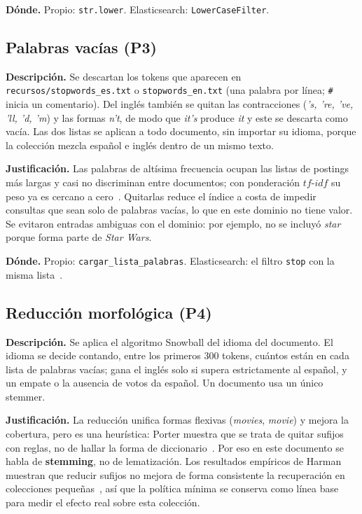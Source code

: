 \documentclass[11pt,spanish]{article}
\begin{document}
\textbf{Dónde.} Propio: \texttt{str.lower}. Elasticsearch: \texttt{LowerCaseFilter}.

\subsection{Palabras vacías (P3)}
\textbf{Descripción.} Se descartan los tokens que aparecen en \texttt{recursos/stopwords\_es.txt} o \texttt{stopwords\_en.txt} (una palabra por línea; \texttt{\#} inicia un comentario). Del inglés también se quitan las contracciones (\textit{'s, 're, 've, 'll, 'd, 'm}) y las formas \textit{n't}, de modo que \textit{it's} produce \textit{it} y este se descarta como vacía. Las dos listas se aplican a todo documento, sin importar su idioma, porque la colección mezcla español e inglés dentro de un mismo texto.

\textbf{Justificación.} Las palabras de altísima frecuencia ocupan las listas de postings más largas y casi no discriminan entre documentos; con ponderación $tf\text{-}idf$ su peso ya es cercano a cero~\cite{salton1988}. Quitarlas reduce el índice a costa de impedir consultas que sean solo de palabras vacías, lo que en este dominio no tiene valor. Se evitaron entradas ambiguas con el dominio: por ejemplo, no se incluyó \textit{star} porque forma parte de \textit{Star Wars}.

\textbf{Dónde.} Propio: \texttt{cargar\_lista\_palabras}. Elasticsearch: el filtro \texttt{stop} con la misma lista~\cite{es-stopfilter}.

\subsection{Reducción morfológica (P4)}
\textbf{Descripción.} Se aplica el algoritmo Snowball del idioma del documento. El idioma se decide contando, entre los primeros 300 tokens, cuántos están en cada lista de palabras vacías; gana el inglés solo si supera estrictamente al español, y un empate o la ausencia de votos da español. Un documento usa un único stemmer.

\textbf{Justificación.} La reducción unifica formas flexivas (\textit{movies}, \textit{movie}) y mejora la cobertura, pero es una heurística: Porter muestra que se trata de quitar sufijos con reglas, no de hallar la forma de diccionario~\cite{porter1980,porter2001}. Por eso en este documento se habla de \textbf{stemming}, no de lematización. Los resultados empíricos de Harman muestran que reducir sufijos no mejora de forma consistente la recuperación en colecciones pequeñas~\cite{harman1991}, así que la política mínima se conserva como línea base para medir el efecto real sobre esta colección.
\end{document}
